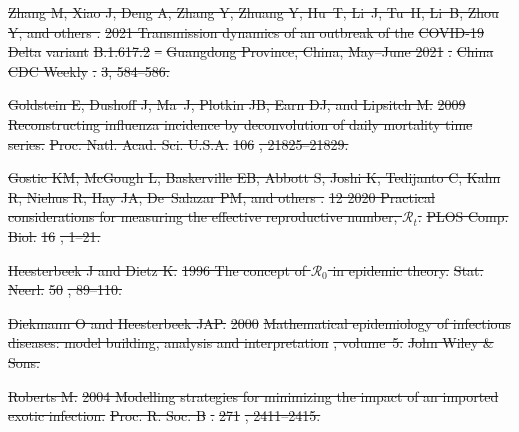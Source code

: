 \documentclass[12pt]{article}
\providecommand{\DIFdeltex}[1]{{\protect\color{red}\sout{#1}}}                      %
\providecommand{\DIFdel}[1]{\texorpdfstring{\DIFdeltex{#1}}{}} %
\begin{document}
\DIFdel{Zhang M, Xiao J, Deng A, Zhang Y, Zhuang Y, Hu~T, Li~J, Tu~H, Li~B, Zhou Y, and
  others .
}%
\DIFdel{2021 Transmission dynamics of an outbreak of the }%
\DIFdel{COVID-19}%
\DIFdel{Delta}%
\DIFdel{variant }%
\DIFdel{B.1.617.2}%
\DIFdel{--}%
\DIFdel{Guangdong Province, China, May--June 2021}%
\DIFdel{.
}%
\DIFdel{China CDC Weekly}%
\DIFdel{.
}%
\DIFdel{3, 584--586.
}%

\DIFdel{Goldstein E, Dushoff J, Ma~J, Plotkin JB, Earn DJ, and Lipsitch M.
}%
\DIFdel{2009 Reconstructing influenza incidence by deconvolution of daily
  mortality time series.
}%
\DIFdel{Proc. Natl. Acad. Sci. U.S.A.}%
\DIFdel{106}%
\DIFdel{, 21825--21829.
}%

\DIFdel{Gostic KM, McGough L, Baskerville EB, Abbott S, Joshi K, Tedijanto C, Kahn R,
  Niehus R, Hay JA, De~Salazar PM, and others .
}%
\DIFdel{12 2020 Practical considerations for measuring the effective
  reproductive number, $\mathcal{R}_t$.
}%
\DIFdel{PLOS Comp. Biol.}%
\DIFdel{16}%
\DIFdel{, 1--21.
}%

\DIFdel{Heesterbeek J and Dietz K.
}%
\DIFdel{1996 The concept of $\mathcal{R}_0$ in epidemic theory.
}%
\DIFdel{Stat. Neerl.}%
\DIFdel{50}%
\DIFdel{, 89--110.
}%

\DIFdel{Diekmann O and Heesterbeek JAP.
}%
\DIFdel{2000 }%
\DIFdel{Mathematical epidemiology of infectious diseases: model
  building, analysis and interpretation}%
\DIFdel{, volume~5.
}%
\DIFdel{John Wiley \& Sons.
}%

\DIFdel{Roberts M.
}%
\DIFdel{2004 Modelling strategies for minimizing the impact of an imported
  exotic infection.
}%
\DIFdel{Proc. R. Soc. B}%
\DIFdel{.
}%
\DIFdel{271}%
\DIFdel{, 2411--2415.
}%
\end{document}
